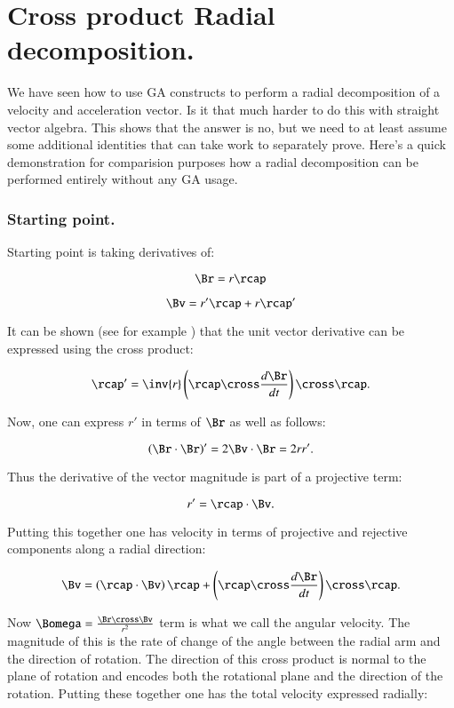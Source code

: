 
\chapter{Cross product Radial decomposition.}\label{chap:PJAngAccCross}

We have seen how to use GA constructs to perform a radial 
decomposition of a velocity and acceleration vector.  Is it that
much harder to do this with straight vector algebra.  This shows that
the answer is no, but we need to at least assume some additional
identities that can take work to separately prove.  Here's a quick
demonstration for comparision purposes how a radial decomposition 
can be performed entirely without any GA usage.

\subsection{Starting point.}

Starting point is taking derivatives of:

\[
\Br = r \rcap
\]

\[
\Bv = r' \rcap + r \rcap'
\]

It can be shown (see for example \cite{salas1990coa}) that the unit vector derivative can be expressed using the cross product:

\[
\rcap' = \inv{r} \left(\rcap \cross \frac{d\Br}{dt}\right) \cross \rcap.
\]

Now, one can express $r'$ in terms of $\Br$ as well as follows:

\[
\left(\Br \cdot \Br\right)' = 2 \Bv \cdot \Br = 2 r r'.
\]

Thus the derivative of the vector magnitude is part of a projective term:

\[
r' = \rcap \cdot \Bv.
\]

Putting this together one has velocity in terms of projective and rejective
components along a radial direction:

\[
\Bv = \left(\rcap \cdot \Bv\right) \rcap + \left(\rcap \cross \frac{d\Br}{dt}\right) \cross \rcap.
\]

Now $\Bomega = \frac{\Br \cross \Bv}{r^2}$ term is what we call the angular velocity.  The magnitude of this
is the rate of change of the angle between the radial arm and the direction of rotation.  The direction of this
cross product is normal to the plane of rotation and encodes both the rotational plane and the direction of the
rotation.  Putting these together one has the total velocity expressed radially:

